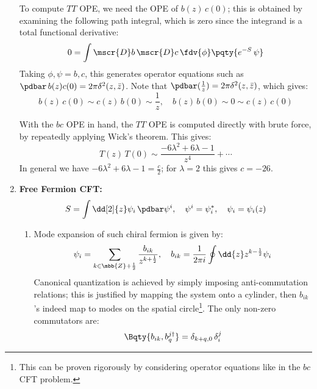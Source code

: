 \documentclass[a4paper,10pt]{article}
\begin{document}
\begin{enumerate}
	To compute $TT$ OPE, we need the OPE of $b(z)\,c(0)$; this is obtained by examining the following path integral, which is zero since the integrand is a total functional derivative:
	\begin{equation}
		0 = \int \mscr{D}b\,\mscr{D}c\,
			\fdv{\phi}\pqty{e^{-S}\,\psi}
	\end{equation}
	Taking $\phi,\psi=b,c$, this generates operator equations such as $
		\pdbar\,b(z)c(0)
		= 2\pi\delta^2(z,\bar{z})
	$. Note that $
		\pdbar(\frac{1}{z})
		= 2\pi\delta^2(z,\bar{z})
	$, which gives:
	\begin{equation}
		b(z)\,c(0) \sim c(z)\,b(0)
		\sim \frac{1}{z},\quad
		b(z)\,b(0) \sim 0
		\sim c(z)\,c(0)
	\end{equation}
	
	With the $bc$ OPE in hand, the $TT$ OPE is computed directly with brute force, by repeatedly applying Wick's theorem. This gives:
	\begin{equation}
		T(z)\,T(0)
		\sim \frac{
			-6\lambda^2 + 6\lambda - 1
		}{z^4} + \cdots
	\end{equation}
	In general we have $
		-6\lambda^2 + 6\lambda - 1
		= \frac{c}{2}
	$; for $\lambda = 2$ this gives $c = -26$. 
	\qedfull
	
	\item \textbf{Free Fermion CFT:}
	\begin{equation}
		S = \int \dd[2]{z}
			\psi_i\,\pdbar\psi^i,\quad
		\psi^i = \psi_i^*,\quad
		\psi_i = \psi_i(z)
	\end{equation}
	
	\begin{enumerate}
	\item Mode expansion of such chiral fermion is given by:
	\begin{equation}
		\psi_i = \sum_{
			k\in\mbb{Z}+\frac{1}{2}
		} \frac{b_{ik}}{z^{k+\frac{1}{2}}},\quad
		b_{ik}
		= \frac{1}{2\pi i} \oint \dd{z}
			z^{k-\frac{1}{2}} \psi_i
	\end{equation}
	Canonical quantization is achieved by simply imposing anti-commutation relations; this is justified by mapping the system onto a cylinder, then $b_{ik}$'s indeed map to modes on the spatial circle\footnote{
		This can be proven rigorously by considering operator equations like in the $bc$ CFT problem. 
	}. The only non-zero commutators are:
	\begin{equation}
		\Bqty{b_{ik},b^{j\dagger}_q}
		= \delta_{k+q,0}\,\delta^j_i
	\end{equation}
	

\end{enumerate}
\end{enumerate}
\end{document}
